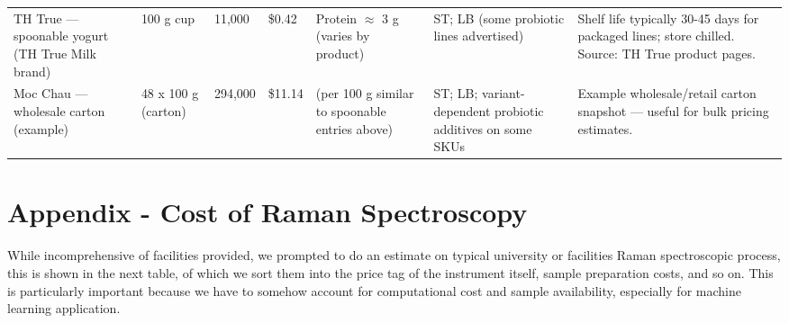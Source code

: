 \documentclass{iopjournal}
\begin{document}
\begin{table}[htbp]
\begin{threeparttable}
\begin{longtable}{@{} Q T T T Q Q Q @{}}
  TH True — spoonable yogurt (TH True Milk brand)
    & 100 g cup
    & 11,000
    & \$0.42
    & Protein $\approx$ 3 g (varies by product)
    & ST; LB (some probiotic lines advertised)
    & Shelf life typically 30-45 days for packaged lines; store chilled. Source: TH True product pages. \\

  Moc Chau — wholesale carton (example)
    & 48 x 100 g (carton)
    & 294,000
    & \$11.14
    & (per 100 g similar to spoonable entries above)
    & ST; LB; variant-dependent probiotic additives on some SKUs
    & Example wholesale/retail carton snapshot — useful for bulk pricing estimates. \\

  \bottomrule
\end{longtable}
  \end{threeparttable}
\end{table}

\section{Appendix - Cost of Raman Spectroscopy}

While incomprehensive of facilities provided, we prompted to do an estimate on typical university or facilities Raman spectroscopic process, this is shown in the next table, of which we sort them into the price tag of the instrument itself, sample preparation costs, and so on. This is particularly important because we have to somehow account for computational cost and sample availability, especially for machine learning application. 
\end{document}
